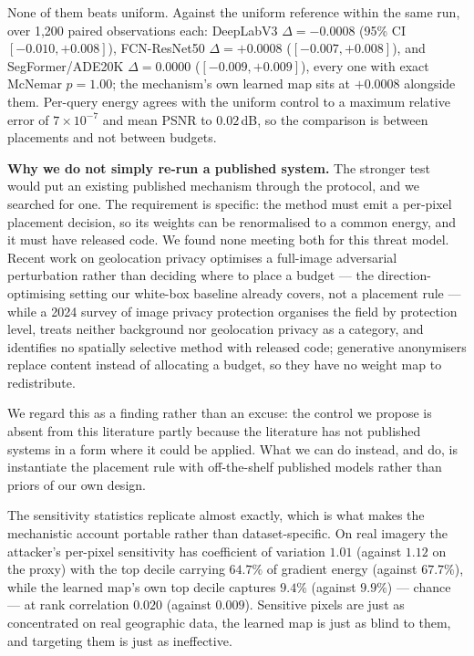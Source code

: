 \documentclass[10pt,journal]{IEEEtran}
\begin{document}
None of them beats uniform. Against the uniform reference within the same run,
over 1,200 paired observations each: DeepLabV3 $\Delta=-0.0008$ (95\% CI
$[-0.010, +0.008]$), FCN-ResNet50 $\Delta=+0.0008$ ($[-0.007, +0.008]$), and
SegFormer/ADE20K $\Delta=0.0000$ ($[-0.009, +0.009]$), every one with exact
McNemar $p=1.00$; the mechanism's own learned map sits at $+0.0008$ alongside
them. Per-query energy agrees with the uniform control to a maximum relative
error of $7\times10^{-7}$ and mean PSNR to $0.02$\,dB, so the comparison is
between placements and not between budgets.

\textbf{Why we do not simply re-run a published system.} The stronger test
would put an existing published mechanism through the protocol, and we
searched for one. The requirement is specific: the method must emit a
per-pixel placement decision, so its weights can be renormalised to a common
energy, and it must have released code. We found none meeting both for this
threat model. Recent work on geolocation privacy optimises a full-image
adversarial perturbation rather than deciding where to place a budget --- the
direction-optimising setting our white-box baseline already covers, not a
placement rule --- while a 2024 survey of image privacy protection organises
the field by protection level, treats neither background nor geolocation
privacy as a category, and identifies no spatially selective method with
released code; generative anonymisers replace content instead of allocating a
budget, so they have no weight map to redistribute.

We regard this as a finding rather than an excuse: the control we propose is
absent from this literature partly because the literature has not published
systems in a form where it could be applied. What we can do instead, and do,
is instantiate the placement rule with off-the-shelf published models rather
than priors of our own design.

The sensitivity statistics replicate almost exactly, which is what makes the
mechanistic account portable rather than dataset-specific. On real imagery the
attacker's per-pixel sensitivity has coefficient of variation $1.01$ (against
$1.12$ on the proxy) with the top decile carrying $64.7\%$ of gradient energy
(against $67.7\%$), while the learned map's own top decile captures $9.4\%$
(against $9.9\%$) --- chance --- at rank correlation $0.020$ (against
$0.009$). Sensitive pixels are just as concentrated on real geographic data,
the learned map is just as blind to them, and targeting them is just as
ineffective.
\end{document}
